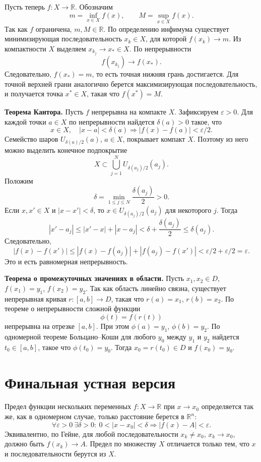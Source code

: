 \documentclass[12pt,a4paper]{article}
\newcommand{\R}{\mathbb{R}}
\newcommand{\eps}{\varepsilon}
\newcommand{\Ball}[2]{U_{#1}(#2)}
\begin{document}
Пусть теперь \(f:X\to\R\). Обозначим
\[
  m=\inf_{x\in X}f(x), \qquad M=\sup_{x\in X}f(x).
\]
Так как \(f\) ограничена, \(m,M\in\R\). По определению инфимума существует
минимизирующая последовательность \(x_k\in X\), для которой \(f(x_k)\to m\).
Из компактности \(X\) выделяем \(x_{k_j}\to x_*\in X\). По непрерывности
\[
  f(x_{k_j})\to f(x_*).
\]
Следовательно, \(f(x_*)=m\), то есть точная нижняя грань достигается. Для
точной верхней грани аналогично берется максимизирующая последовательность, и
получается точка \(x^*\in X\), такая что \(f(x^*)=M\).

\textbf{Теорема Кантора.}
Пусть \(f\) непрерывна на компакте \(X\). Зафиксируем \(\eps>0\). Для каждой
точки \(a\in X\) по непрерывности найдется \(\delta(a)>0\) такое, что
\[
  x\in X,\quad |x-a|<\delta(a)
  \Rightarrow |f(x)-f(a)|<\eps/2.
\]
Семейство шаров \(\Ball{\delta(a)/2}{a}\), \(a\in X\), покрывает компакт
\(X\). Поэтому из него можно выделить конечное подпокрытие
\[
  X\subset\bigcup_{j=1}^N \Ball{\delta(a_j)/2}{a_j}.
\]
Положим
\[
  \delta=\min_{1\le j\le N}\frac{\delta(a_j)}{2}>0.
\]
Если \(x,x'\in X\) и \(|x-x'|<\delta\), то \(x\in\Ball{\delta(a_j)/2}{a_j}\)
для некоторого \(j\). Тогда
\[
  |x'-a_j|\le |x'-x|+|x-a_j|<\delta+\frac{\delta(a_j)}2\le\delta(a_j).
\]
Следовательно,
\[
  |f(x)-f(x')|
  \le |f(x)-f(a_j)|+|f(a_j)-f(x')|
  <\eps/2+\eps/2=\eps.
\]
Это и есть равномерная непрерывность.

\textbf{Теорема о промежуточных значениях в области.}
Пусть \(x_1,x_2\in D\), \(f(x_1)=y_1\), \(f(x_2)=y_2\). Так как область
линейно связна, существует непрерывная кривая \(r:[a,b]\to D\), такая что
\(r(a)=x_1\), \(r(b)=x_2\). По теореме о непрерывности сложной функции
\[
  \phi(t)=f(r(t))
\]
непрерывна на отрезке \([a,b]\). При этом \(\phi(a)=y_1\), \(\phi(b)=y_2\).
По одномерной теореме Больцано--Коши для любого \(y_0\) между \(y_1\) и
\(y_2\) найдется \(t_0\in[a,b]\), такое что \(\phi(t_0)=y_0\). Тогда
\(x_0=r(t_0)\in D\) и \(f(x_0)=y_0\).

\section*{Финальная устная версия}

Предел функции нескольких переменных \(f:X\to\R\) при \(x\to x_0\) определяется
так же, как в одномерном случае, только расстояние берется в \(\R^n\):
\[
  \forall\eps>0\ \exists\delta>0:\ 0<|x-x_0|<\delta
  \Rightarrow |f(x)-A|<\eps.
\]
Эквивалентно, по Гейне, для любой последовательности \(x_k\ne x_0\),
\(x_k\to x_0\), должно быть \(f(x_k)\to A\). Предел по множеству \(X\)
отличается только тем, что \(x\) и последовательности берутся из \(X\).
\end{document}

